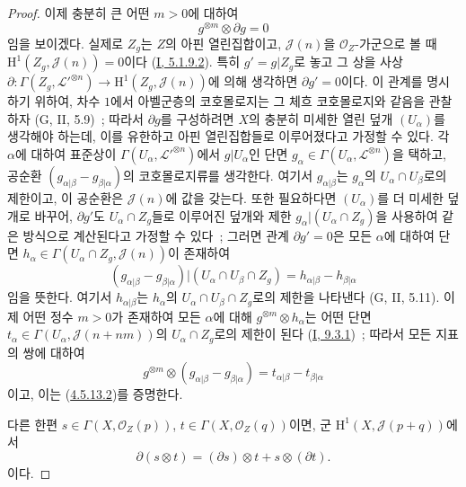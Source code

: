 \begin{proof}
이제 충분히 큰 어떤 $m>0$에 대하여
\begin{equation}
\label{II.4.5.13.2-ko}
  g^{\otimes m}\otimes\partial g=0
\tag{4.5.13.2}
\end{equation}
임을 보이겠다. 실제로 $Z_g$는 $Z$의 아핀 열린집합이고,
$\mathcal{J}(n)$을 $\mathcal{O}_Z$-가군으로 볼 때
$\mathrm{H}^1(Z_g,\mathcal{J}(n))=0$이다
(\hyperref[I.5.1.9.2-ko]{I, 5.1.9.2}). 특히 $g'=g|Z_g$로 놓고 그 상을
사상
$\partial:\Gamma(Z_g,\mathcal{L}'^{\otimes n})\to
\mathrm{H}^1(Z_g,\mathcal{J}(n))$에 의해 생각하면 $\partial g'=0$이다.
이 관계를 명시하기 위하여, 차수 $1$에서 아벨군층의 코호몰로지는
그 체흐 코호몰로지와 같음을 관찰하자 (G, II, 5.9)~; 따라서
$\partial g$를 구성하려면 $X$의 충분히 미세한 열린 덮개
$(U_\alpha)$를 생각해야 하는데, 이를 유한하고 아핀 열린집합들로
이루어졌다고 가정할 수 있다. 각 $\alpha$에 대하여 표준상이
$\Gamma(U_\alpha,\mathcal{L}'^{\otimes n})$에서 $g|U_\alpha$인 단면
$g_\alpha\in\Gamma(U_\alpha,\mathcal{L}^{\otimes n})$을 택하고,
공순환 $(g_{\alpha|\beta}-g_{\beta|\alpha})$의 코호몰로지류를
생각한다. 여기서 $g_{\alpha|\beta}$는 $g_\alpha$의
$U_\alpha\cap U_\beta$로의 제한이고, 이 공순환은
$\mathcal{J}(n)$에 값을 갖는다. 또한 필요하다면 $(U_\alpha)$를 더
미세한 덮개로 바꾸어, $\partial g'$도 $U_\alpha\cap Z_g$들로 이루어진
덮개와 제한 $g_\alpha|(U_\alpha\cap Z_g)$을 사용하여 같은 방식으로
계산된다고 가정할 수 있다~; 그러면 관계 $\partial g'=0$은 모든
$\alpha$에 대하여 단면
$h_\alpha\in\Gamma(U_\alpha\cap Z_g,\mathcal{J}(n))$이 존재하여
\[
  (g_{\alpha|\beta}-g_{\beta|\alpha})
  |(U_\alpha\cap U_\beta\cap Z_g)
  =h_{\alpha|\beta}-h_{\beta|\alpha}
\]
임을 뜻한다. 여기서 $h_{\alpha|\beta}$는 $h_\alpha$의
$U_\alpha\cap U_\beta\cap Z_g$로의 제한을 나타낸다 (G, II, 5.11).
이제 어떤 정수 $m>0$가 존재하여 모든 $\alpha$에 대해
$g^{\otimes m}\otimes h_\alpha$는 어떤 단면
$t_\alpha\in\Gamma(U_\alpha,\mathcal{J}(n+nm))$의
$U_\alpha\cap Z_g$로의 제한이 된다
(\hyperref[I.9.3.1-ko]{I, 9.3.1})~; 따라서 모든 지표의 쌍에 대하여
\[
  g^{\otimes m}\otimes(g_{\alpha|\beta}-g_{\beta|\alpha})
  =t_{\alpha|\beta}-t_{\beta|\alpha}
\]
이고, 이는 (\hyperref[II.4.5.13.2-ko]{4.5.13.2})를 증명한다.

다른 한편
$s\in\Gamma(X,\mathcal{O}_Z(p))$,
$t\in\Gamma(X,\mathcal{O}_Z(q))$이면, 군
$\mathrm{H}^1(X,\mathcal{J}(p+q))$에서
\begin{equation}
\label{II.4.5.13.3-ko}
  \partial(s\otimes t)=(\partial s)\otimes t+s\otimes(\partial t).
\tag{4.5.13.3}
\end{equation}
이다.


\end{proof}
